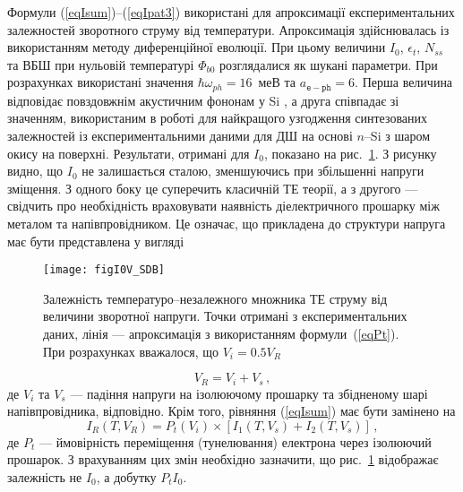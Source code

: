 Формули (\ref{eqIsum})--(\ref{eqIpat3}) використані для апроксимації експериментальних залежностей зворотного струму від температури.
Апроксимація здійснювалась із використанням методу диференційної еволюції.
При цьому величини $I_0$, $\epsilon_t$, $N_{ss}$ та ВБШ при нульовій температурі $\Phi_{b0}$ розглядалися як шукані параметри.
При розрахунках використані значення $\hbar\omega_{ph}=16$~меВ
та $a_\mathtt{e-ph}=6$.
Перша величина відповідає повздовжнім акустичним фононам у Si \cite[с.~312]{ShalimovaBook},
 а друга співпадає зі значенням, використаним в роботі \cite{PipinsFTP} для найкращого узгодження синтезованих залежностей із експериментальними даними для ДШ на основі $n$--Si з шаром окису на поверхні.
Результати, отримані для $I_0$, показано на рис.~\ref{figI0V_SDB}.
З рисунку видно, що $I_0$ не залишається сталою, зменшуючись при збільшенні напруги зміщення.
З одного боку це суперечить класичній ТЕ теорії, а з другого --- свідчить
про необхідність враховувати наявність діелектричного прошарку між металом та напівпровідником.
Це означає, що
прикладена до структури напруга має бути представлена у вигляді



\begin{figure}[b]
\center
\texttt{[image: figI0V\_SDB]}
\caption{\label{figI0V_SDB}
Залежність температуро--незалежного множника ТЕ струму від величини зворотної напруги.
Точки отримані з експериментальних даних,
лінія --- апроксимація з використанням формули~(\ref{eqPt}).
При розрахунках вважалося, що $V_i=0.5V_R$
}%
\end{figure}


\begin{equation}\label{eqVR}
    V_R=V_i+V_s\,,
\end{equation}
де
$V_i$ та $V_s$ --- падіння напруги на ізолюючому прошарку та збідненому шарі напівпровідника, відповідно.
Крім того, рівняння (\ref{eqIsum}) має бути замінено на
\begin{equation}\label{eqIsum2}
    I_R(T,V_R)=P_t(V_i)\times[I_1(T,V_s)+I_2(T,V_s)]\,,
\end{equation}
де
$P_t$ --- ймовірність переміщення (тунелювання) електрона через ізолюючий прошарок.
З врахуванням цих змін необхідно зазначити, що рис.~\ref{figI0V_SDB} відображає залежність не $I_0$,
а добутку $P_tI_0$.

